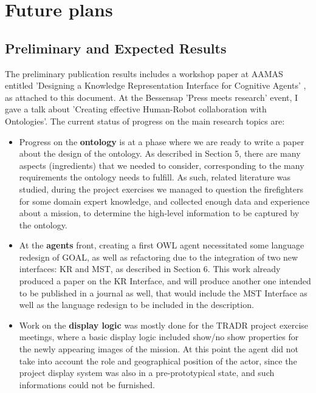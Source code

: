 \section{Future plans}
\subsection{Preliminary and Expected Results}

The preliminary publication results includes a workshop paper at AAMAS entitled 'Designing a Knowledge Representation Interface for Cognitive Agents' \cite{}, as attached to this document. 
At the Bessensap 'Press meets research' event, I gave a talk about 'Creating effective Human-Robot collaboration with Ontologies'. 
The current status of progress on the main research topics are: 
\begin{itemize}
\item Progress on the \textbf{ontology} is at a phase where we are ready to write a paper about the design of the ontology. As described in Section 5, there are many aspects (ingredients) that we needed to consider, corresponding to the many requirements the ontology needs to fulfill. As such, related literature was studied, during the project exercises we managed to question the firefighters for some domain expert knowledge, and collected enough data and experience about a mission, to determine the high-level information to be captured by the ontology. 
\item At the \textbf{agents} front, creating a first OWL agent necessitated some language redesign of GOAL, as well as refactoring due to the integration of two new interfaces: KR and MST, as described in Section 6. This work already produced a paper on the KR Interface, and will produce another one intended to be published in a journal as well, that would include the MST Interface as well as the language redesign to be included in the description. 
\item Work on the \textbf{display logic} was mostly done for the TRADR project exercise meetings, where a basic display logic included show/no show properties for the newly appearing images of the mission. At this point the agent did not take into account the role and geographical position of the actor, since the project display system was also in a pre-prototypical state, and such informations could not be furnished. 
\end{itemize}

